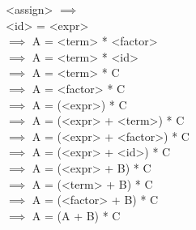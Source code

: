 \documentclass[letterpaper, 11pt]{article}
\begin{document}
\begin{minipage}{0.8\textwidth}
\centering
\begin{grammar}
	<assign> $\implies$\\
	<id> = <expr> \\
	$\implies$ A = <term> * <factor> \\
	$\implies$ A = <term> * <id>\\
	$\implies$ A = <term> * C\\
	$\implies$ A = <factor> * C\\
	$\implies$ A = (<expr>) * C\\
	$\implies$ A = (<expr> + <term>) * C\\
	$\implies$ A = (<expr> + <factor>) * C\\
	$\implies$ A = (<expr> + <id>) * C\\
	$\implies$ A = (<expr> + B) * C\\
	$\implies$ A = (<term> + B) * C\\
	$\implies$ A = (<factor> + B) * C\\
	$\implies$ A = (A + B) * C
\end{grammar}
\end{minipage}
\end{document}
